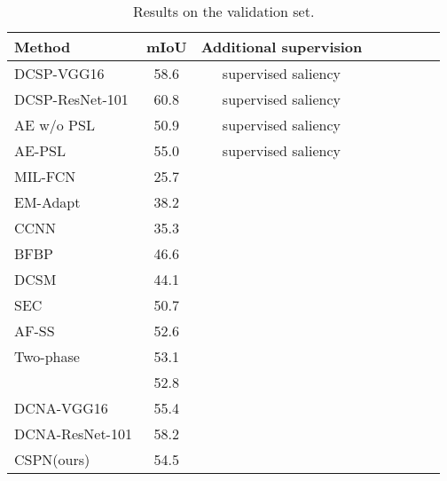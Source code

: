 \documentclass{bmvc2k}
\begin{document}
		\begin{table}[t]
		
		\begin{tabular}{l*{6}{c}r}
			\hline
			
			Method              & mIoU & Additional supervision \\
		\hline
	
		DCSP-VGG16 \citep{chaudhry2017discovering} & 58.6 & supervised saliency& \\
		DCSP-ResNet-101 \citep{chaudhry2017discovering} & 60.8 & supervised saliency& \\
		AE w/o PSL \citep{wei2017object} &50.9 & supervised saliency &\\
		AE-PSL \citep{wei2017object} &55.0 & supervised saliency &\\
		\hline\hline
			
			MIL-FCN \citep{pathakICLR15} & 25.7 & \hspace{44.4mm} \\
			EM-Adapt \citep{papandreou2015weakly}  & 38.2 & \\
			CCNN \citep{pathak2015constrained}  & 35.3 & \\
			BFBP \citep{saleh2016built} & 46.6 & \\
			DCSM \citep{Shimoda2016DistinctCS} & 44.1 & \\
			SEC \citep{kolesnikov2016seed} &50.7 & \\
			AF-SS \citep{qi2016augmented} & 52.6 & \\
			Two-phase \citep{kim2017two} & 53.1 & \\
			\citet{roy2017combining} & 52.8 & \\
			DCNA-VGG16 \citet{zhang2018decoupled} &55.4&\\
			DCNA-ResNet-101 \citet{zhang2018decoupled} &58.2&\\
			CSPN(ours) &54.5&\\ 						
			\hline
		\end{tabular}
		\caption{Results on the validation set.} \label{tab:val_evaluation}
		\end{table}
		
	
\end{document}

